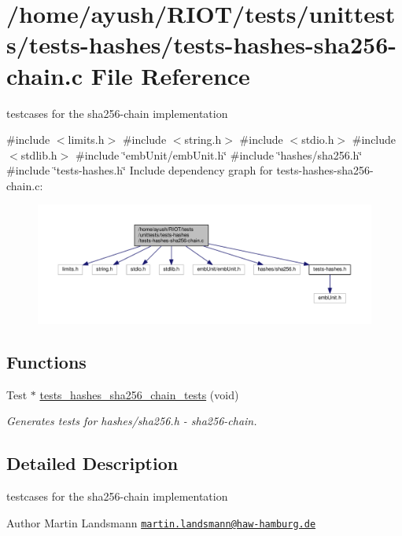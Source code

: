 \hypertarget{tests-hashes-sha256-chain_8c}{}\section{/home/ayush/\+R\+I\+O\+T/tests/unittests/tests-\/hashes/tests-\/hashes-\/sha256-\/chain.c File Reference}
\label{tests-hashes-sha256-chain_8c}


testcases for the sha256-\/chain implementation  


{\ttfamily \#include $<$limits.\+h$>$}\newline
{\ttfamily \#include $<$string.\+h$>$}\newline
{\ttfamily \#include $<$stdio.\+h$>$}\newline
{\ttfamily \#include $<$stdlib.\+h$>$}\newline
{\ttfamily \#include \char`\"{}emb\+Unit/emb\+Unit.\+h\char`\"{}}\newline
{\ttfamily \#include \char`\"{}hashes/sha256.\+h\char`\"{}}\newline
{\ttfamily \#include \char`\"{}tests-\/hashes.\+h\char`\"{}}\newline
Include dependency graph for tests-\/hashes-\/sha256-\/chain.c\+:
\nopagebreak
\begin{figure}[H]
\begin{center}
\leavevmode
\includegraphics[width=350pt]{tests-hashes-sha256-chain_8c__incl}
\end{center}
\end{figure}
\subsection*{Functions}
\begin{DoxyCompactItemize}
\item 
Test $\ast$ \hyperlink{group__unittests_ga31217f1c8fb68025a8a9a17e1a9359b3}{tests\+\_\+hashes\+\_\+sha256\+\_\+chain\+\_\+tests} (void)
\begin{DoxyCompactList}\small\item\em Generates tests for hashes/sha256.\+h -\/ sha256-\/chain. \end{DoxyCompactList}\end{DoxyCompactItemize}


\subsection{Detailed Description}
testcases for the sha256-\/chain implementation 

\begin{DoxyAuthor}{Author}
Martin Landsmann \href{mailto:martin.landsmann@haw-hamburg.de}{\tt martin.\+landsmann@haw-\/hamburg.\+de} 
\end{DoxyAuthor}
